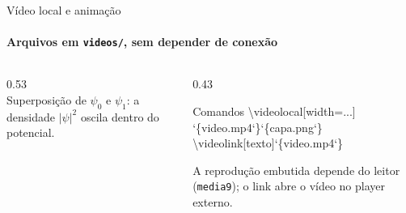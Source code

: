 \begin{frame}{Vídeo local e animação}
  \framesubtitle{Arquivos em \texttt{videos/}, sem depender de conexão}
  \begin{columns}[T,onlytextwidth]
    \begin{column}{0.53\textwidth}
      \centering
      \\[2pt]
      {\scriptsize\color{fisicamuted}%
       Superposição de $\psi_0$ e $\psi_1$: a densidade $|\psi|^2$
       oscila dentro do potencial.}
    \end{column}
    \begin{column}{0.43\textwidth}
      \begin{destaque}{Comandos}
        {\scriptsize\ttfamily
         \textbackslash videolocal[width=...]\\
         \hspace*{1.1em}\char`\{video.mp4\char`\}\char`\{capa.png\char`\}\\[3pt]
         \textbackslash videolink[texto]\char`\{video.mp4\char`\}}%
      \end{destaque}
      \vspace{0.15em}
      {\small{}}
      \vspace{0.45em}

      {\scriptsize\color{fisicamuted}%
       A reprodução embutida depende do leitor (\texttt{media9});
       o link abre o vídeo no player externo.}
    \end{column}
  \end{columns}
\end{frame}
